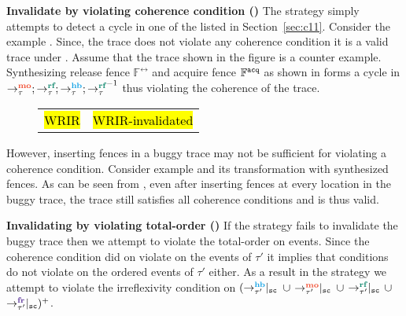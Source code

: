 \noindent
{\bf Invalidate by violating coherence condition (\wkfence)}\newline
The \wkfence strategy simply attempts to detect a cycle in 
one of the  listed in 
Section~\ref{sec:c11}.
%
Consider the example . Since, the trace does not 
violate any coherence condition it is a valid trace under \cc. 
Assume that the trace shown in the figure is a counter example.
%
Synthesizing release fence $\mathbb{F^\rel}$ and acquire fence 
$\mathbb{F^\texttt{acq}}$ as shown in  forms
a cycle in $\setMO;\setRF;\setHB;\setRF^{-1}$ thus violating the
coherence of the trace.
%
\begin{figure}[h]
	\begin{tabular}{|c|c|}
		\hline
		\resizebox{0.5\textwidth}{!}{} &
		\resizebox{0.5\textwidth}{!}{} \\
		\hline
		\multicolumn{1}{c}{\hl{WRIR}} &
		\multicolumn{1}{c}{\hl{WRIR-invalidated}}
	\end{tabular}
\end{figure}

However, inserting fences in a buggy trace may not be sufficient for 
violating a coherence condition. Consider example  and
its transformation  with synthesized fences. 
%
As can be seen from , even after inserting fences 
at every location in the buggy trace, the trace still satisfies all 
coherence conditions and is thus valid.
\newline

\noindent
{\bf Invalidating by violating \sc total-order (\stfence)}\newline
If the \wkfence strategy fails to invalidate the buggy trace then
we attempt to violate the total-order on \sc events.
%
Since the coherence condition did on violate on the events of $\tau'$ 
it implies that conditions do not violate on the \sc ordered events
of $\tau'$ either. 
%
As a result in the \stfence strategy we attempt to violate the 
irreflexivity condition on 
$(\onsc{\hb{\tau'}{}{}}$ $\cup$ $\onsc{\mo{\tau'}{}{}}$ $\cup$ 
$\onsc{\rf{\tau'}{}{}}$ $\cup$ $\onsc{\fr{\tau'}{}{}})^+$. 


